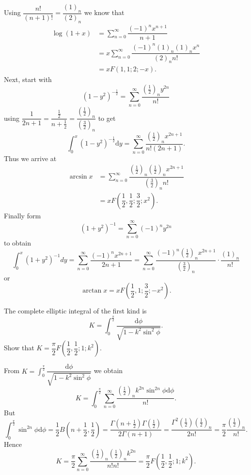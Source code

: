 \begin{solution}
Using $\dfrac{n!}{(n+1)!} = \dfrac{(1)_n}{(2)_n}$ we know that 
$$\begin{array}{ll}
\log(1+x) &= \displaystyle\sum_{n=0}^{\infty} \dfrac{(-1)^n x^{n+1}}{n+1} \\
&= x \displaystyle\sum_{n=0}^{\infty} \dfrac{(-1)^n (1)_n (1)_n x^n}{(2)_n n!} \\
&= x F(1,1;2;-x).
\end{array}$$
Next, start with
$$(1-y^2)^{-\frac{1}{2}} = \displaystyle\sum_{n=0}^{\infty} \dfrac{\left( \frac{1}{2} \right)_n y^{2n}}{n!}$$
using $\dfrac{1}{2n+1} = \dfrac{\frac{1}{2}}{n+\frac{1}{2}} = \dfrac{\left(\frac{1}{2} \right)_n}{\left( \frac{3}{2} \right)_n}$ to get
$$\displaystyle\int_0^x (1-y^2)^{-\frac{1}{2}} \mathrm{d}y = \displaystyle\sum_{n=0}^{\infty} \dfrac{\left( \frac{1}{2} \right)_n x^{2n+1}}{n! (2n+1)}.$$
Thus we arrive at
$$\begin{array}{ll}
\arcsin x &= \displaystyle\sum_{n=0}^{\infty} \dfrac{\left( \frac{1}{2} \right)_n \left( \frac{1}{2} \right)_n x^{2n+1}}{\left( \frac{3}{2} \right)_n n!} \\
&= x F \left( \dfrac{1}{2}, \dfrac{1}{2}; \dfrac{3}{2}; x^2 \right).
\end{array}$$
Finally form
$$(1+y^2)^{-1} = \displaystyle\sum_{n=0}^{\infty} (-1)^n y^{2n}$$
to obtain
$$\displaystyle\int_0^x (1+y^2)^{-1} dy = \displaystyle\sum_{n=0}^{\infty} \dfrac{(-1)^n x^{2n+1}}{2n+1} = \displaystyle\sum_{n=0}^{\infty} \dfrac{(-1)^n \left( \frac{1}{2} \right)_n x^{2n+1}}{\left( \frac{3}{2} \right)_n} \cdot \dfrac{(1)_n}{n!}$$
or
$$\arctan x = x F \left( \dfrac{1}{2}, 1 ; \dfrac{3}{2}; -x^2 \right).$$
\end{solution}
\begin{problem}\label{problem19chapter4}
The complete elliptic integral of the first kind is
$$K = \displaystyle\int_0^{\frac{\pi}{2}} \dfrac{\mathrm{d} \phi}{\sqrt{1-k^2 \sin^2\phi}}.$$
Show that $K = \dfrac{\pi}{2} F \left( \dfrac{1}{2}, \dfrac{1}{2}; 1 ; k^2 \right).$
\end{problem}
\begin{solution}
From $K = \displaystyle\int_0^{\frac{\pi}{2}} \dfrac{\mathrm{d} \phi}{\sqrt{1 - k^2 \sin^2 \phi}}$ we obtain
$$K = \displaystyle\int_0^{\frac{\pi}{2}} \displaystyle\sum_{n=0}^{\infty} \dfrac{ \left(\frac{1}{2} \right)_n k^{2n} \sin^{2n} \phi \mathrm{d} \phi}{n!}.$$
But
$$\displaystyle\int_0^{\frac{\pi}{2}} \sin^{2n}\phi \mathrm{d}\phi = \dfrac{1}{2} B \left(n+\dfrac{1}{2}, \dfrac{1}{2} \right) = \dfrac{\Gamma \left( n + \frac{1}{2} \right) \Gamma \left( \frac{1}{2} \right)}{2 \Gamma(n+1)} = \dfrac{\Gamma^2 \left(\frac{1}{2} \right) \left( \frac{1}{2} \right)_n}{2n!} = \dfrac{\pi}{2} \dfrac{\left( \frac{1}{2} \right)_n}{n!}.$$
Hence
$$K = \dfrac{\pi}{2} \displaystyle\sum_{n=0}^{\infty} \dfrac{ \left( \frac{1}{2} \right)_n \left( \frac{1}{2} \right)_n k^{2n}}{n! n!} = \dfrac{\pi}{2} F \left(\dfrac{1}{2},\dfrac{1}{2};1;k^2 \right).$$
\end{solution}
